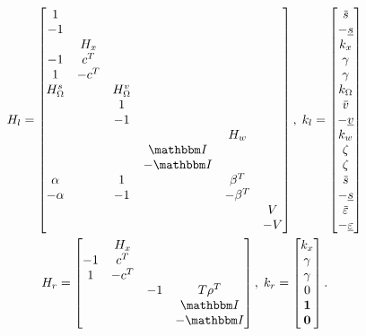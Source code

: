   \begin{gather*}
    H_{l} =
    \begin{bmatrix}
      1 \\ %
      -1 \\ %
        & H_{x} \\ %
      -1  & c^{T} \\ %
      1   & -c^{T} \\ %
      H_{\Omega}^{s} & & H_{\Omega}^{v} \\
      & & 1 \\
      & & -1 \\
      & & & & H_{w} \\
      & & & \IdentityMatrix \\
      & & & -\IdentityMatrix \\
      \alpha & & 1 & & \beta^{T} \\
      -\alpha & & -1 & & -\beta^{T} \\
      & & & & & V \\
      & & & & & -V
    \end{bmatrix}, \;
    k_{l} =
    \begin{bmatrix}
      \overbar{s} \\
      -\underline{s} \\
      k_{x} \\
      \gamma \\
      \gamma \\
      k_{\Omega} \\
      \overbar{v} \\
      -\underline{v} \\
      k_{w} \\
      \zeta \\
      \zeta \\
      \overbar{s} \\
      -\underline{s} \\
      \overbar{\varepsilon} \\
      -\underline{\varepsilon}
    \end{bmatrix} \\
    H_{r} =
    \begin{bmatrix}
      & H_{x} \\ %
      -1  & c^{T} \\ %
      1   & -c^{T} \\ %
      & & -1 & T \rho^{T} \\
      & & & \IdentityMatrix \\
      & & & -\IdentityMatrix
    \end{bmatrix}, \;
    k_{r} =
    \begin{bmatrix}
      k_{x} \\
      \gamma \\
      \gamma \\
      0 \\
      \One \\
      \Zero
    \end{bmatrix} \text.
  \end{gather*}


